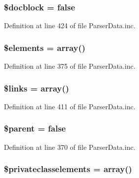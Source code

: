 \hypertarget{classparser_data_abf700ed3060f06f15a7a01354dfd4087}{
\subsubsection[{\$docblock}]{\setlength{\rightskip}{0pt plus 5cm}\$docblock = false}}\label{classparser_data_abf700ed3060f06f15a7a01354dfd4087}


\-Definition at line 424 of file \-Parser\-Data.\-inc.

\hypertarget{classparser_data_ad18dd8fbe31b294e2bc4711dcde4548d}{
\subsubsection[{\$elements}]{\setlength{\rightskip}{0pt plus 5cm}\$elements = array()}}\label{classparser_data_ad18dd8fbe31b294e2bc4711dcde4548d}


\-Definition at line 375 of file \-Parser\-Data.\-inc.

\hypertarget{classparser_data_a4ca8be3ff3cf95aa3af546449c1f1bec}{
\subsubsection[{\$links}]{\setlength{\rightskip}{0pt plus 5cm}\$links = array()}}\label{classparser_data_a4ca8be3ff3cf95aa3af546449c1f1bec}


\-Definition at line 411 of file \-Parser\-Data.\-inc.

\hypertarget{classparser_data_a4e2313a4b35b72a06ac45fd38960f677}{
\subsubsection[{\$parent}]{\setlength{\rightskip}{0pt plus 5cm}\$parent = false}}\label{classparser_data_a4e2313a4b35b72a06ac45fd38960f677}


\-Definition at line 370 of file \-Parser\-Data.\-inc.

\hypertarget{classparser_data_a4788546834382e747a7b958764510268}{
\subsubsection[{\$privateclasselements}]{\setlength{\rightskip}{0pt plus 5cm}\$privateclasselements = array()}}\label{classparser_data_a4788546834382e747a7b958764510268}


